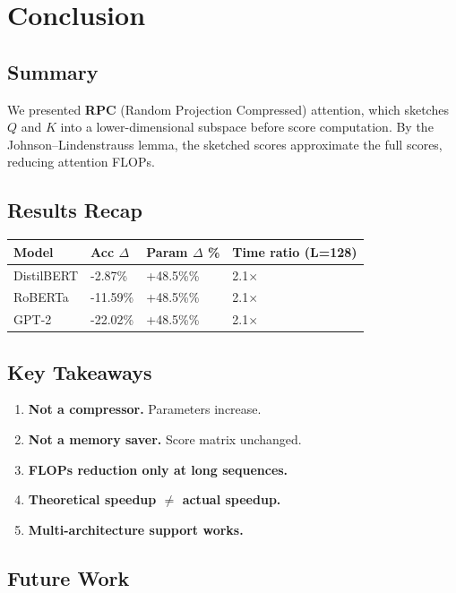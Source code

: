 
\section{Conclusion}

\subsection{Summary}

We presented \textbf{RPC} (Random Projection Compressed) attention, which sketches 
$Q$ and $K$ into a lower-dimensional subspace before score computation. 
By the Johnson--Lindenstrauss lemma, the sketched scores approximate the 
full scores, reducing attention FLOPs.

\subsection{Results Recap}

\begin{table}[H]
\centering
\small
\begin{tabular}{llll}
\toprule
\textbf{Model} & \textbf{Acc $\Delta$} & \textbf{Param $\Delta$ \%} & \textbf{Time ratio (L=128)} \\
\midrule
DistilBERT & -2.87\% & +48.5\%\% & 2.1$\times$ \\
RoBERTa & -11.59\% & +48.5\%\% & 2.1$\times$ \\
GPT-2 & -22.02\% & +48.5\%\% & 2.1$\times$ \\
\bottomrule
\end{tabular}
\end{table}

\subsection{Key Takeaways}

\begin{enumerate}
\item \textbf{Not a compressor.} Parameters increase.
\item \textbf{Not a memory saver.} Score matrix unchanged.
\item \textbf{FLOPs reduction only at long sequences.}
\item \textbf{Theoretical speedup $\ne$ actual speedup.}
\item \textbf{Multi-architecture support works.}

\end{enumerate}
\subsection{Future Work}

